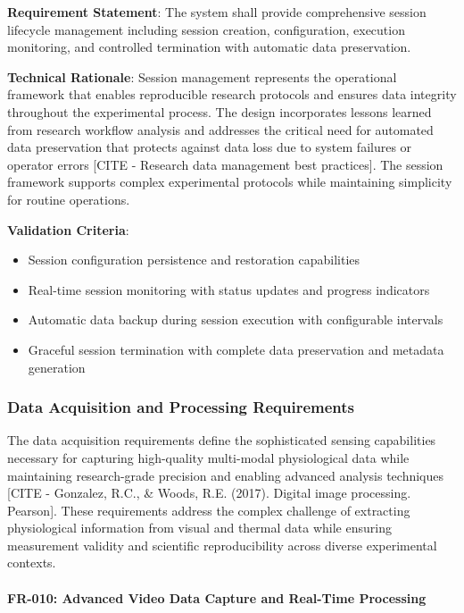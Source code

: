 \documentclass[12pt,a4paper]{report}
\begin{document}
\textbf{Requirement Statement}: The system shall provide comprehensive session lifecycle management including session
creation, configuration, execution monitoring, and controlled termination with automatic data preservation.

\textbf{Technical Rationale}: Session management represents the operational framework that enables reproducible research
protocols and ensures data integrity throughout the experimental process. The design incorporates lessons learned from
research workflow analysis and addresses the critical need for automated data preservation that protects against data
loss due to system failures or operator errors [CITE - Research data management best practices]. The session framework
supports complex experimental protocols while maintaining simplicity for routine operations.

\textbf{Validation Criteria}:

\begin{itemize}
\item Session configuration persistence and restoration capabilities
\item Real-time session monitoring with status updates and progress indicators
\item Automatic data backup during session execution with configurable intervals
\item Graceful session termination with complete data preservation and metadata generation

\end{itemize}
\subsubsection{Data Acquisition and Processing Requirements}

The data acquisition requirements define the sophisticated sensing capabilities necessary for capturing high-quality
multi-modal physiological data while maintaining research-grade precision and enabling advanced analysis
techniques [CITE - Gonzalez, R.C., \& Woods, R.E. (2017). Digital image processing. Pearson]. These requirements address
the complex challenge of extracting physiological information from visual and thermal data while ensuring measurement
validity and scientific reproducibility across diverse experimental contexts.

\paragraph{FR-010: Advanced Video Data Capture and Real-Time Processing}
\end{document}
